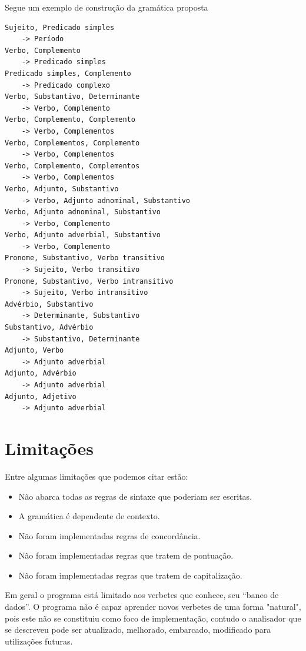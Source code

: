 \documentclass[12pt,a4paper,oneside,english,brazilian,brazil]{abntex2}
\begin{document}
Segue um exemplo de construção da gramática proposta

\setlength{\parindent}{0cm}
\hrulefill
\setlength{\parindent}{1.25cm}	
\begin{verbatim}
Sujeito, Predicado simples               
    -> Período
Verbo, Complemento                       
    -> Predicado simples
Predicado simples, Complemento           
    -> Predicado complexo
Verbo, Substantivo, Determinante         
    -> Verbo, Complemento
Verbo, Complemento, Complemento          
    -> Verbo, Complementos
Verbo, Complementos, Complemento         
    -> Verbo, Complementos
Verbo, Complemento, Complementos         
    -> Verbo, Complementos
Verbo, Adjunto, Substantivo              
    -> Verbo, Adjunto adnominal, Substantivo
Verbo, Adjunto adnominal, Substantivo    
    -> Verbo, Complemento
Verbo, Adjunto adverbial, Substantivo    
    -> Verbo, Complemento
Pronome, Substantivo, Verbo transitivo   
    -> Sujeito, Verbo transitivo
Pronome, Substantivo, Verbo intransitivo 
    -> Sujeito, Verbo intransitivo
Advérbio, Substantivo                    
    -> Determinante, Substantivo
Substantivo, Advérbio                    
    -> Substantivo, Determinante
Adjunto, Verbo                           
    -> Adjunto adverbial
Adjunto, Advérbio                        
    -> Adjunto adverbial
Adjunto, Adjetivo                        
    -> Adjunto adverbial
\end{verbatim}


\chapter{Limitações}

\par Entre algumas limitações que podemos citar estão:

\begin{itemize}
\item Não abarca todas as regras de sintaxe que poderiam ser escritas.
\item A gramática é dependente de contexto.
\item Não foram implementadas regras de concordância.
\item Não foram implementadas regras que tratem de pontuação.
\item Não foram implementadas regras que tratem de capitalização.
\end{itemize}

\par Em geral o programa está limitado aos verbetes que conhece, seu ``banco de dados''. O programa não é capaz aprender novos verbetes de uma forma "natural", pois este não se constituiu como foco de implementação, contudo o analisador que se descreveu pode ser atualizado, melhorado, embarcado, modificado para utilizações futuras. \
\end{document}
